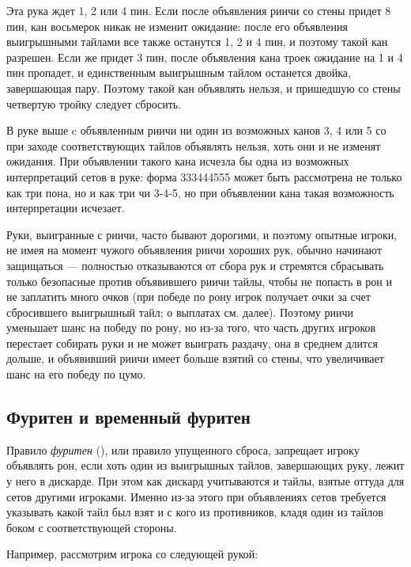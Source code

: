 Эта рука ждет 1, 2 или 4 пин. Если после объявления риичи со стены придет 8 пин, кан восьмерок никак не изменит ожидание: после его объявления выигрышными тайлами все также останутся 1, 2 и 4 пин, и поэтому такой кан разрешен. Если же придет 3 пин, после объявления кана троек ожидание на 1 и 4 пин пропадет, и единственным выигрышным тайлом останется двойка, завершающая пару. Поэтому такой кан объявлять нельзя, и пришедшую со стены четвертую тройку следует сбросить. 


В руке выше c объявленным риичи ни один из возможных канов 3, 4 или 5 со при заходе соответствующих тайлов объявлять нельзя, хоть они и не изменят ожидания. При объявлении такого кана исчезла бы одна из возможных интерпретаций сетов в руке: форма 333444555 может быть рассмотрена не только как три пона, но и как три чи 3-4-5, но при объявлении кана такая возможность интерпретации исчезает. 

Руки, выигранные с риичи, часто бывают дорогими, и поэтому опытные игроки, не имея на момент чужого объявления риичи хороших рук, обычно начинают защищаться --- полностью отказываются от сбора рук и стремятся сбрасывать только безопасные против объявившего риичи тайлы, чтобы не попасть в рон и не заплатить много очков (при победе по рону игрок получает очки за счет сбросившего выигрышный тайл; о выплатах см. далее). Поэтому риичи уменьшает шанс на победу по рону, но из-за того, что часть других игроков перестает собирать руки и не может выиграть раздачу, она в среднем длится дольше, и объявивший риичи имеет больше взятий со стены, что увеличивает шанс на его победу по цумо.

\subsection{Фуритен и временный фуритен}

Правило \textit{фуритен} (), или правило упущенного сброса, запрещает игроку объявлять рон, если хоть один из выигрышных тайлов, завершающих руку, лежит у него в дискарде. При этом как дискард учитываются и тайлы, взятые оттуда для сетов другими игроками. Именно из-за этого при объявлениях сетов требуется указывать какой тайл был взят и с кого из противников, кладя один из тайлов боком с соответствующей стороны.

Например, рассмотрим игрока со следующей рукой:


